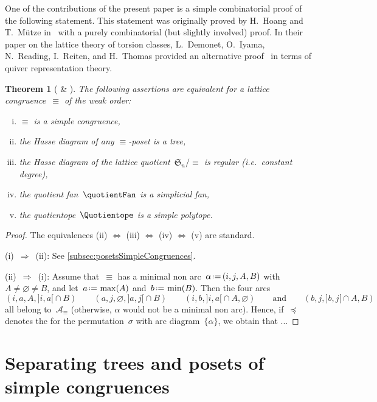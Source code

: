 \documentclass{amsart}
\newtheorem{theorem}{Theorem}[section]
\theoremstyle{definition}
\newcommand{\f}[1]{{\mathfrak{#1}}} %
\newcommand{\eqdef}{\mbox{\,\raisebox{0.2ex}{\scriptsize\ensuremath{\mathrm:}}\ensuremath{=}\,}} %
\newcommand{\ie}{\textit{i.e.}~} %
\newcommand{\vincent}[1]{\todo[color=blue!30]{#1 \\ \hfill --- V.}}
\newcommand{\arcs}{{\mathcal{A}}} %
\begin{document}
One of the contributions of the present paper is a simple combinatorial proof of the following statement.
This statement was originally proved by H.~Hoang and T.~Mütze in~\cite[Sect.~4.4]{HoangMutze} with a purely combinatorial (but slightly involved) proof.
In their paper on the lattice theory of torsion classes, L.~Demonet, O.~Iyama, N.~Reading, I.~Reiten, and H.~Thomas provided an alternative proof~\cite[Sect.~6.3]{DemonetIyamaReadingReitenThomas} in terms of quiver representation theory.

\begin{theorem}[{\cite[Sect.~4.4]{HoangMutze} \& \cite[Sect.~6.3]{DemonetIyamaReadingReitenThomas}}]
\label{thm:simpleCongruences}
The following assertions are equivalent for a lattice congruence~$\equiv$ of the weak order:
\begin{enumerate}[(i)]
\item $\equiv$ is a simple congruence,
\item the Hasse diagram of any $\equiv$-poset is a tree,
\item the Hasse diagram of the lattice quotient~$\f{S}_n/{\equiv}$ is regular (\ie constant degree),
\item the quotient fan~$\quotientFan$ is a simplicial fan,
\item the quotientope~$\Quotientope$ is a simple polytope.
\end{enumerate}
\end{theorem}

\begin{proof}
The equivalences (ii) $\iff$ (iii) $\iff$ (iv) $\iff$ (v) are standard.

(i)~$\Longrightarrow$~(ii): See \cref{subsec:posetsSimpleCongruences}.

(ii)~$\Longrightarrow$~(i): Assume that~$\equiv$ has a minimal non arc~$\alpha \eqdef (i, j, A, B)$ with~$A \ne \varnothing \ne B$, and let~$a \eqdef \max(A)$ and~$b \eqdef \min(B)$. Then the four arcs
\[
(i, a, A, {]i,a[} \cap B)
\qquad
(a, j, \varnothing, {]a,j[} \cap B)
\qquad
(i, b, {]i,a[} \cap A, \varnothing)
\qquad\text{and}\qquad
(b, j, {]b,j[} \cap A, B)
\]
all belong to~$\arcs_\equiv$ (otherwise, $\alpha$ would not be a minimal non arc).
Hence, if~$\preccurlyeq$ denotes the  for the permutation~$\sigma$ with arc diagram~$\{\alpha\}$, we obtain that ... \vincent{todo}
\end{proof}


\section{Separating trees and posets of simple congruences}
\label{sec:separatingTreesPostesSimpleCongruences}
\end{document}
